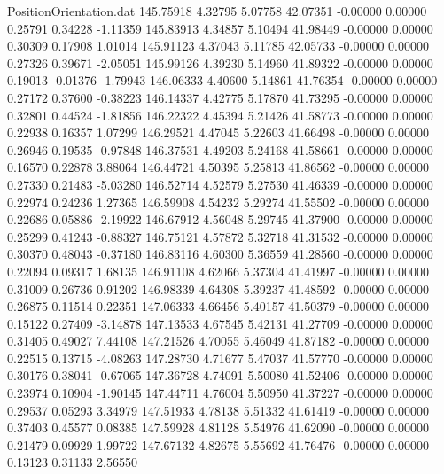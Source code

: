 \begin{filecontents}{PositionOrientation.dat}
 145.75918    4.32795    5.07758    42.07351   -0.00000    0.00000    0.25791    0.34228   -1.11359
 145.83913    4.34857    5.10494    41.98449   -0.00000    0.00000    0.30309    0.17908    1.01014
 145.91123    4.37043    5.11785    42.05733   -0.00000    0.00000    0.27326    0.39671   -2.05051
 145.99126    4.39230    5.14960    41.89322   -0.00000    0.00000    0.19013   -0.01376   -1.79943
 146.06333    4.40600    5.14861    41.76354   -0.00000    0.00000    0.27172    0.37600   -0.38223
 146.14337    4.42775    5.17870    41.73295   -0.00000    0.00000    0.32801    0.44524   -1.81856
 146.22322    4.45394    5.21426    41.58773   -0.00000    0.00000    0.22938    0.16357    1.07299
 146.29521    4.47045    5.22603    41.66498   -0.00000    0.00000    0.26946    0.19535   -0.97848
 146.37531    4.49203    5.24168    41.58661   -0.00000    0.00000    0.16570    0.22878    3.88064
 146.44721    4.50395    5.25813    41.86562   -0.00000    0.00000    0.27330    0.21483   -5.03280
 146.52714    4.52579    5.27530    41.46339   -0.00000    0.00000    0.22974    0.24236    1.27365
 146.59908    4.54232    5.29274    41.55502   -0.00000    0.00000    0.22686    0.05886   -2.19922
 146.67912    4.56048    5.29745    41.37900   -0.00000    0.00000    0.25299    0.41243   -0.88327
 146.75121    4.57872    5.32718    41.31532   -0.00000    0.00000    0.30370    0.48043   -0.37180
 146.83116    4.60300    5.36559    41.28560   -0.00000    0.00000    0.22094    0.09317    1.68135
 146.91108    4.62066    5.37304    41.41997   -0.00000    0.00000    0.31009    0.26736    0.91202
 146.98339    4.64308    5.39237    41.48592   -0.00000    0.00000    0.26875    0.11514    0.22351
 147.06333    4.66456    5.40157    41.50379   -0.00000    0.00000    0.15122    0.27409   -3.14878
 147.13533    4.67545    5.42131    41.27709   -0.00000    0.00000    0.31405    0.49027    7.44108
 147.21526    4.70055    5.46049    41.87182   -0.00000    0.00000    0.22515    0.13715   -4.08263
 147.28730    4.71677    5.47037    41.57770   -0.00000    0.00000    0.30176    0.38041   -0.67065
 147.36728    4.74091    5.50080    41.52406   -0.00000    0.00000    0.23974    0.10904   -1.90145
 147.44711    4.76004    5.50950    41.37227   -0.00000    0.00000    0.29537    0.05293    3.34979
 147.51933    4.78138    5.51332    41.61419   -0.00000    0.00000    0.37403    0.45577    0.08385
 147.59928    4.81128    5.54976    41.62090   -0.00000    0.00000    0.21479    0.09929    1.99722
 147.67132    4.82675    5.55692    41.76476   -0.00000    0.00000    0.13123    0.31133    2.56550

\end{filecontents}
